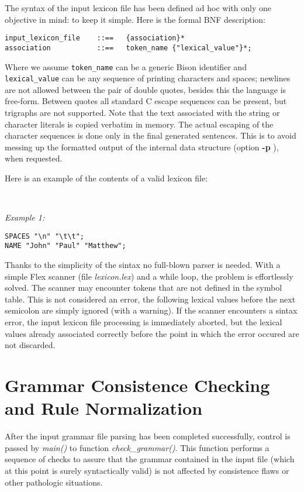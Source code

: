 \documentclass[a4paper,12pt]{article}
\begin{document}
The syntax of the input lexicon file has been defined ad hoc with only one objective in mind: to keep it simple. Here is the formal BNF description:

\begin{verbatim}
input_lexicon_file    ::==   {association}*
association           ::==   token_name {"lexical_value"}*;
\end{verbatim}

Where we assume \verb/token_name/ can be a generic Bison identifier and \verb/lexical_value/ can be any sequence of printing characters and spaces; newlines are not allowed between the pair of double quotes, besides this the language is free-form. Between quotes all standard C escape sequences can be present, but trigraphs are not supported. Note that the text associated with the string or character literals is copied verbatim in memory. The actual escaping of the character sequences is done only in the final generated sentences. This is to avoid messing up the formatted output of the internal data structure (option \textbf{-p} ), when requested.

\noindent
Here is an example of the contents of a valid lexicon file:

\

\noindent
\emph{Example 1:}

\begin{verbatim}
SPACES "\n" "\t\t";
NAME "John" "Paul" "Matthew";
\end{verbatim}

Thanks to the simplicity of the sintax no full-blown parser is needed. With a simple Flex scanner (file \emph{lexicon.lex}) and a while loop, the problem is effortlessly solved.
The scanner may encounter tokens that are not defined in the symbol table. This is not considered an error, the following lexical values before the next semicolon are simply ignored (with a warning).
If the scanner encounters a sintax error, the input lexicon file processing is immediately aborted, but the lexical values already associated correctly before the point in which the error occured are not discarded.



\section{Grammar Consistence Checking and Rule Normalization}

After the input grammar file parsing has been completed successfully, control is passed by \emph{main()} to function \emph{check\_grammar()}. This function performs a sequence of checks to assure that the grammar contained in the input file (which at this point is surely syntactically valid) is not affected by consistence flaws or other pathologic situations.
\end{document}
